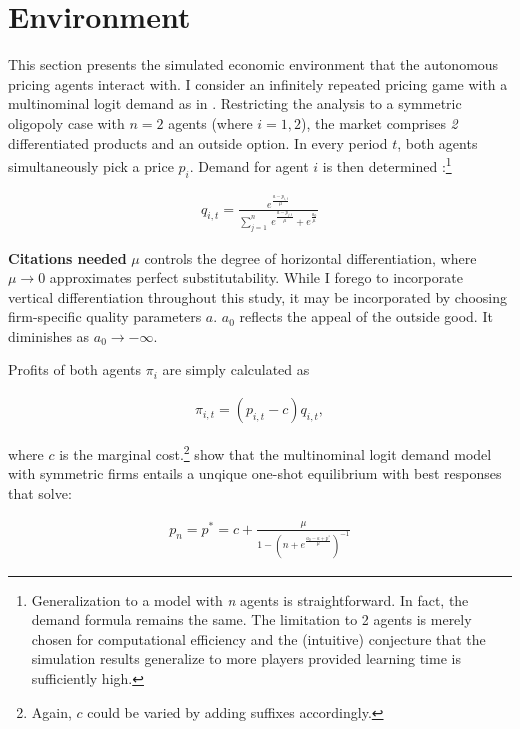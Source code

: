 \section{Environment}\label{enironment}

This section presents the simulated economic environment that the autonomous pricing agents interact with. I consider an infinitely repeated pricing game with a multinominal logit demand as in \textcite{calvano_artificial_2019}. Restricting the analysis to a symmetric oligopoly case with $n=2$ agents (where $i = 1,2$), the market comprises \emph{2} differentiated products and an outside option. In every period $t$, both agents simultaneously pick a price $p_i$. Demand for agent $i$ is then determined \parencite{anderson_logit_1992}:\footnote{Generalization to a model with \emph{n} agents is straightforward. In fact, the demand formula remains the same. The limitation to 2 agents is merely chosen for computational efficiency and the (intuitive) conjecture that the simulation results generalize to more players provided learning time is sufficiently high.}

\begin{gather}\label{quantity}
q_{i,t}=\frac{e^{\frac{a - p_{i,t}}{\mu}}}{\sum_{j=1}^{n}~ e^{\frac{a-p_{j,t}}{\mu}}+e^{\frac{a_0}{\mu}}}
\end{gather}

\textbf{Citations needed}
$\mu$ controls the degree of horizontal differentiation, where $\mu \rightarrow 0$ approximates perfect substitutability. While I forego to incorporate vertical differentiation throughout this study, it may be incorporated by choosing firm-specific quality parameters $a$. $a_0$ reflects the appeal of the outside good. It diminishes as $a_0 \rightarrow -\infty$. 

Profits of both agents $\pi_i$ are simply calculated as

\begin{gather}\label{profit}
\pi_{i,t} = (p_{i,t} - c) q_{i,t},
\end{gather}

where $c$ is the marginal cost.\footnote{Again, $c$ could be varied by adding suffixes accordingly.} \textcite{anderson_logit_1992} show that the multinominal logit demand model with symmetric firms entails a unqique one-shot equilibrium with best responses that solve:

\begin{gather}\label{best_response}
	p_n = p^* = c + \frac{\mu}{1 - (n + e^{\frac{a_0 - a + p^*}{\mu}})^{-1}}
\end{gather}

